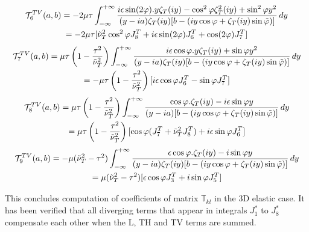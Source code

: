 \begin{multline}
\mathcal{T}_6^{TV}(a,b)=-2\mu\tau\int_{-\infty}^{+\infty} \frac{ i\epsilon\sin(2\varphi).y\zeta_T(iy)- \cos^2\varphi \zeta_T^2(iy)+ \sin^2\varphi y^2}{(y-ia)\zeta_T(iy)\lbrack b- (iy\cos \varphi+\zeta_T(iy)\sin\phiti) \rbrack} \, dy\\
\hfill=-2\mu\tau \lbrack \nuti_T^2\cos^2\varphi J_8^T+i\epsilon\sin(2\varphi)J_6^T+\cos(2\varphi)J_7^T \rbrack \hfill
\end{multline}
\begin{multline}
\mathcal{T}_7^{TV}(a,b)=\mu\tau\left(1-\frac{\tau^2}{\nuti_T^2}\right)\int_{-\infty}^{+\infty} \frac{ i\epsilon\cos\varphi.y\zeta_T(iy)+ \sin\varphi y^2}{(y-ia)\zeta_T(iy)\lbrack b- (iy\cos \varphi+\zeta_T(iy)\sin\phiti) \rbrack} \, dy \\
\hfill =-\mu\tau\left(1-\frac{\tau^2}{\nuti_T^2}\right) \lbrack i\epsilon\cos\varphi J_6^T-\sin\varphi J_7^T \rbrack \hfill
\end{multline}
\begin{multline}
\mathcal{T}_8^{TV}(a,b)=\mu\tau\left(1-\frac{\tau^2}{\nuti_T^2}\right)\int_{-\infty}^{+\infty} \frac{ \cos\varphi.\zeta_T(iy)-i\epsilon \sin\varphi y}{(y-ia)\lbrack b- (iy\cos \varphi+\zeta_T(iy)\sin\phiti) \rbrack} \, dy\\
\hfill=\mu\tau \left(1-\frac{\tau^2}{\nuti_T^2}\right)\lbrack\cos\varphi (J_7^T+\nuti_T^2J_8^T) +i\epsilon\sin\varphi J_6^T \rbrack \hfill
\end{multline}
\begin{multline}
\mathcal{T}_9^{TV}(a,b)=-\mu(\nuti_T^2-\tau^2)\int_{-\infty}^{+\infty} \frac{ \epsilon\cos\varphi.\zeta_T(iy)- i\sin\varphi y}{(y-ia)\zeta_T(iy)\lbrack b- (iy\cos \varphi+\zeta_T(iy)\sin\phiti) \rbrack} \, dy\\
\hfill=\mu(\nuti_T^2-\tau^2)\lbrack \epsilon\cos\varphi J_3^T+i\sin\varphi  J_5^T \rbrack \hfill
\end{multline}

This concludes computation of coefficients of matrix $\mathbb{T}_{kl}$ in the 3D elastic case. It has been verified that all diverging terms that appear in integrals $J_1^*$ to $J_8^*$ compensate each other when the L, TH and TV terms are summed.
